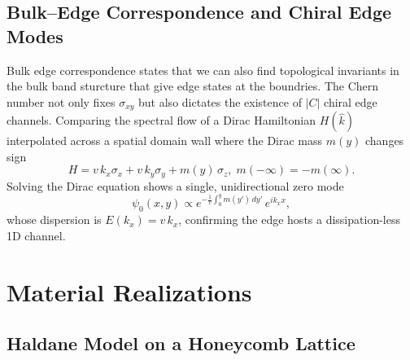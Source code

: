 \documentclass[aps,prb,twocolumn]{revtex4-2}
\begin{document}
    \subsection{Bulk–Edge Correspondence and Chiral Edge Modes}
      Bulk edge correspondence states that we can also find topological invariants in the bulk band sturcture that give edge states at the boundries. The Chern number not only fixes $\sigma_{xy}$ but also dictates the existence of $|C|$ chiral edge channels. Comparing the spectral flow of a Dirac Hamiltonian $H(\hat k)$ interpolated across a spatial domain wall where the Dirac mass $m(y)$ changes sign
      \begin{equation}
        H = v\,k_{x}\sigma_{x} + v\,k_{y}\sigma_{y} + m(y)\,\sigma_{z}, \;
        m(-\infty)=-m(\infty)\!.
      \end{equation}
      Solving the Dirac equation shows a single, unidirectional zero mode
      \[ \psi_{0}(x,y)\propto e^{-\!\tfrac1v\!\int_{0}^{y} m(y')\,dy'}\,e^{ik_{x}x}, \]
      whose dispersion is $E(k_{x})=v\,k_{x}$, confirming the edge hosts a
      dissipation-less 1D channel.      

  \section{Material Realizations}
    \subsection{Haldane Model on a Honeycomb Lattice}
\end{document}
